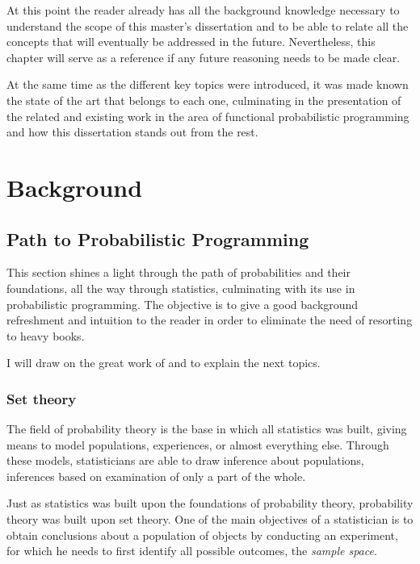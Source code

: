 \documentclass[
  oneside,
  11pt, a4paper,
  footinclude=true,
  headinclude=true,
  cleardoublepage=empty
]{scrbook}
\theoremstyle{definition}
\theoremstyle{definition}
\begin{document}
    At this point the reader already has all the background knowledge necessary to understand the scope of this master's dissertation and to be able to relate all the concepts that will eventually be addressed in the future. Nevertheless, this chapter will serve as a reference if any future reasoning needs to be made clear.
    
    At the same time as the different key topics were introduced, it was made known the state of the art that belongs to each one, culminating in the presentation of the related and existing work in the area of functional probabilistic programming and how this dissertation stands out from the rest.          
    
    \chapter{Background}\label{ch-background}
    
        \section{Path to Probabilistic Programming}\label{s-2-2}
    
        This section shines a light through the path of probabilities and their foundations, all the way through statistics, culminating with its use in probabilistic programming. The objective is to give a good background refreshment and intuition to the reader in order to eliminate the need of resorting to heavy books.
        
        I will draw on the great work of \cite{CaseBerg:01} and \cite{RePEc:bes:amstat:v:59:y:2005:m:august:p:276-276} to explain the next topics.
         
        \subsection{Set theory}
        
            The field of probability theory is the base in which all statistics was built, giving means to model populations, experiences, or almost everything else. Through these models, statisticians are able to draw inference about populations, inferences based on examination of only a part of the whole.
            
            Just as statistics was built upon the foundations of probability theory, probability theory was built upon set theory. One of the main objectives of a statistician is to obtain conclusions about a population of objects by conducting an experiment, for which he needs to first identify all possible outcomes, the \emph{sample space}.
            
\end{document}
